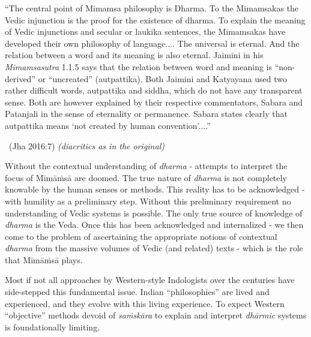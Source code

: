 \begin{myquote}
“The central point of Mimamsa philosophy is Dharma. To the Mimamsakas the Vedic injunction is the proof for the existence of dharma. To explain the meaning of Vedic injunctions and secular or laukika sentences, the Mimamsakas have developed their own philosophy of language.... The universal is eternal. And the relation between a word and its meaning is also eternal. Jaimini in his \textit{Mimamsasutra} 1.1.5 says that the relation between word and meaning is “non-derived” or “uncreated” (autpattika). Both Jaimini and Katyayana used two rather difficult words, autpattika and siddha, which do not have any transparent sense. Both are however explained by their respective commentators, Sabara and Patanjali in the sense of eternality or permanence. Sabara states clearly that autpattika means ‘not created by human convention’....”

~\hfill (Jha 2016:7) \textit{(diacritics as in the original)}
\end{myquote}

\vspace{-.05cm}

Without the contextual understanding of \textit{dharma }- attempts to interpret the focus of Mīmāṁsā are doomed. The true nature of \textit{dharma} is not completely knowable by the human senses or methods. This reality has to be acknowledged - with humility as a preliminary step. Without this preliminary requirement no understanding of Vedic systems is possible. The only true source of knowledge of \textit{dharma} is the Veda. Once this has been acknowledged and internalized - we then come to the problem of ascertaining the appropriate notions of contextual \textit{dharma} from the massive volumes of Vedic (and related) texts - which is the role that Mīmāṁsā plays.

\vspace{-.05cm}

Most if not all approaches by Western-style Indologists over the centuries have side-stepped this fundamental issue. Indian “philosophies” are lived and experienced, and they evolve with this living experience. To expect Western “objective” methods devoid of \textit{saṁskāra} to explain and interpret \textit{dhārmic} systems is foundationally limiting.


